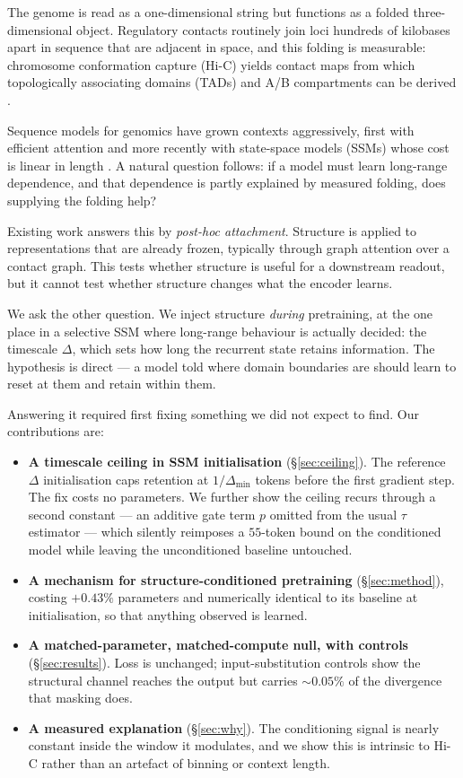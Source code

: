 \documentclass[10pt]{article}
\begin{document}
The genome is read as a one-dimensional string but functions as a folded
three-dimensional object. Regulatory contacts routinely join loci hundreds of
kilobases apart in sequence that are adjacent in space, and this folding is
measurable: chromosome conformation capture (Hi-C) yields contact maps from
which topologically associating domains (TADs) and A/B compartments can be
derived \citep{liebermanaiden2009, rao2014}.

Sequence models for genomics have grown contexts aggressively, first with
efficient attention and more recently with state-space models (SSMs) whose cost
is linear in length \citep{gu2023mamba, nguyen2023hyenadna, schiff2024caduceus}.
A natural question follows: if a model must learn long-range dependence, and
that dependence is partly explained by measured folding, does supplying the
folding help?

Existing work answers this by \emph{post-hoc attachment}. Structure is applied
to representations that are already frozen, typically through graph attention
over a contact graph. This tests whether structure is useful for a downstream
readout, but it cannot test whether structure changes what the encoder learns.

We ask the other question. We inject structure \emph{during} pretraining, at the
one place in a selective SSM where long-range behaviour is actually decided: the
timescale $\Delta$, which sets how long the recurrent state retains information.
The hypothesis is direct --- a model told where domain boundaries are should
learn to reset at them and retain within them.

Answering it required first fixing something we did not expect to find. Our
contributions are:

\begin{itemize}
\itemsep2pt
\item \textbf{A timescale ceiling in SSM initialisation} (\S\ref{sec:ceiling}).
The reference $\Delta$ initialisation caps retention at $1/\Delta_{\min}$ tokens
before the first gradient step. The fix costs no parameters. We further show the
ceiling recurs through a second constant --- an additive gate term $p$ omitted
from the usual $\tau$ estimator --- which silently reimposes a $55$-token bound
on the conditioned model while leaving the unconditioned baseline untouched.
\item \textbf{A mechanism for structure-conditioned pretraining}
(\S\ref{sec:method}), costing $+0.43\%$ parameters and numerically identical to
its baseline at initialisation, so that anything observed is learned.
\item \textbf{A matched-parameter, matched-compute null, with controls}
(\S\ref{sec:results}). Loss is unchanged; input-substitution controls show the
structural channel reaches the output but carries $\sim\!0.05\%$ of the
divergence that masking does.
\item \textbf{A measured explanation} (\S\ref{sec:why}). The conditioning signal
is nearly constant inside the window it modulates, and we show this is intrinsic
to Hi-C rather than an artefact of binning or context length.
\end{itemize}
\end{document}
